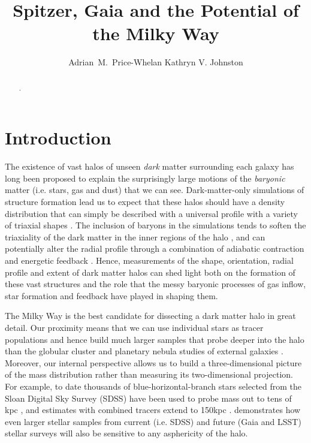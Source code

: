 \documentclass[preprint]{aastex}
\begin{document}
\title{Spitzer, Gaia and the Potential of the Milky Way}

\author{Adrian~M.~Price-Whelan Kathryn V. Johnston}


\begin{abstract}
.
\end{abstract}


\section{Introduction}
\label{intro.sec}
 The existence of vast halos of unseen {\it dark} matter surrounding each galaxy has long been proposed \citep[e.g.,][]{zwicky37,rubin70} to explain the surprisingly large
motions of the {\it baryonic} matter (i.e. stars, gas and dust) that we can see.
Dark-matter-only simulations of structure formation lead us to expect that these  halos should have a density distribution that can simply be described with a universal
profile \citep{navarro96} with a variety of triaxial shapes \citep{jing02}.
The inclusion of baryons in the simulations tends to soften the triaxiality of the dark matter in the inner regions of the halo \citep[as the disk forms, see e.g.,][]{bailin05}, and
can potentially alter the radial profile through a combination of adiabatic contraction and energetic feedback \citep[see recent discussion by][]{pontzen12}.
Hence, measurements of the shape, orientation, radial profile and extent of dark matter halos can shed light both on the formation of these vast structures and the role that
the messy baryonic processes of gas inflow, star formation and feedback  have played in shaping them.

The Milky Way is the best candidate  for dissecting a dark matter halo in great detail.
Our proximity means that we can use individual stars as tracer populations and hence build much larger samples that probe deeper into the halo than the globular cluster
and planetary nebula studies of external galaxies \citep[e.g.][]{mendez01,cote03}.
Moreover, our internal perspective allows us to build a three-dimensional picture of the mass distribution rather than measuring its two-dimensional projection.
For example, to date thousands of blue-horizontal-branch stars selected from the Sloan Digital Sky Survey (SDSS) have been used to probe mass out to tens of
kpc \citep[SDSS, see][]{deason12a,kafle12}, and estimates with combined tracers extend to 150kpc \citep{deason12b}.
\citet{loebman12} demonstrates how even larger stellar samples from current (i.e. SDSS) and future  (Gaia and LSST) stellar surveys will also be sensitive to any
asphericity of the halo.
\end{document}
